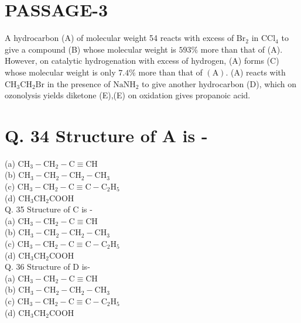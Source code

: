 \documentclass[10pt]{article}
\begin{document}
\section*{PASSAGE-3}
A hydrocarbon (A) of molecular weight 54 reacts with excess of $\mathrm{Br}_{2}$ in $\mathrm{CCl}_{4}$ to give a compound (B) whose molecular weight is $593 \%$ more than that of (A). However, on catalytic hydrogenation with excess of hydrogen, (A) forms (C) whose molecular weight is only $7.4 \%$ more than that of $(\mathrm{A})$. (A) reacts with $\mathrm{CH}_{3} \mathrm{CH}_{2} \mathrm{Br}$ in the presence of $\mathrm{NaNH}_{2}$ to give another hydrocarbon (D), which on ozonolysis yields diketone (E),(E) on oxidation gives propanoic acid.

\section*{Q. 34 Structure of A is -}
(a) $\mathrm{CH}_{3}-\mathrm{CH}_{2}-\mathrm{C} \equiv \mathrm{CH}$\\
(b) $\mathrm{CH}_{3}-\mathrm{CH}_{2}-\mathrm{CH}_{2}-\mathrm{CH}_{3}$\\
(c) $\mathrm{CH}_{3}-\mathrm{CH}_{2}-\mathrm{C} \equiv \mathrm{C}-\mathrm{C}_{2} \mathrm{H}_{5}$\\
(d) $\mathrm{CH}_{3} \mathrm{CH}_{2} \mathrm{COOH}$\\
Q. 35 Structure of C is -\\
(a) $\mathrm{CH}_{3}-\mathrm{CH}_{2}-\mathrm{C} \equiv \mathrm{CH}$\\
(b) $\mathrm{CH}_{3}-\mathrm{CH}_{2}-\mathrm{CH}_{2}-\mathrm{CH}_{3}$\\
(c) $\mathrm{CH}_{3}-\mathrm{CH}_{2}-\mathrm{C} \equiv \mathrm{C}-\mathrm{C}_{2} \mathrm{H}_{5}$\\
(d) $\mathrm{CH}_{3} \mathrm{CH}_{2} \mathrm{COOH}$\\
Q. 36 Structure of D is-\\
(a) $\mathrm{CH}_{3}-\mathrm{CH}_{2}-\mathrm{C} \equiv \mathrm{CH}$\\
(b) $\mathrm{CH}_{3}-\mathrm{CH}_{2}-\mathrm{CH}_{2}-\mathrm{CH}_{3}$\\
(c) $\mathrm{CH}_{3}-\mathrm{CH}_{2}-\mathrm{C} \equiv \mathrm{C}-\mathrm{C}_{2} \mathrm{H}_{5}$\\
(d) $\mathrm{CH}_{3} \mathrm{CH}_{2} \mathrm{COOH}$
\end{document}
